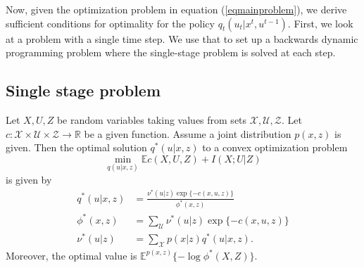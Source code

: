 Now, given the optimization problem in equation (\ref{eqmainproblem}), we derive sufficient conditions for optimality for the policy $q_t(u_t|x^t,u^{t-1})$. First, we look at a problem with a single time step. We use that to set up a backwards dynamic programming problem where the single-stage problem is solved at each step.
\vspace{-0.25cm}
\subsection{Single stage problem}

\label{secsinglestage}
Let $X, U, Z$ be random variables taking values from sets $\mathcal{X}, \mathcal{U}, \mathcal{Z}$.
Let $c:\mathcal{X}\times \mathcal{U}\times \mathcal{Z}\rightarrow \mathbb{R}$ be a given function. 
Assume a joint distribution $p(x,z)$ is given.
Then the optimal solution $q^*(u|x, z)$ to a convex optimization problem
\[
\min_{q(u|x,z)} \mathbb{E}c(X,U,Z)+I(X;U|Z)
\]
is given by \cite{csiszar1974extremum}
\begin{align*}
q^*(u|x,z)&=\frac{\nu^*(u|z)\exp\{-c(x,u,z)\}}{\phi^*(x,z)} \\
\phi^*(x,z)&=\sum_{\mathcal{U}} \nu^*(u|z)\exp\{-c(x,u,z)\} \\
\nu^*(u|z)&=\sum_{\mathcal{X}} p(x|z)q^*(u|x,z).
\end{align*}
Moreover, the optimal value is $\mathbb{E}^{p(x,z)}\{-\log \phi^*(X,Z)\}$.

